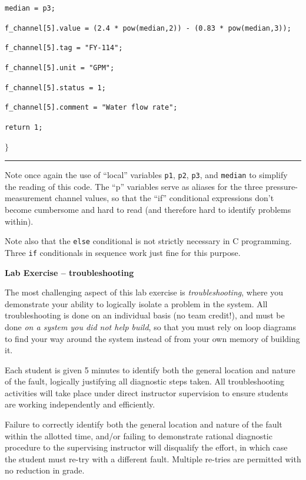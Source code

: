 {{{{\hskip 20pt {\tt  median = p3;}

\vskip 10pt

\hskip 10pt {\tt  f\_channel[5].value = (2.4 * pow(median,2)) - (0.83 * pow(median,3));}

\hskip 10pt {\tt  f\_channel[5].tag = "FY-114";}

\hskip 10pt {\tt  f\_channel[5].unit = "GPM";}

\hskip 10pt {\tt  f\_channel[5].status = 1;}

\hskip 10pt {\tt  f\_channel[5].comment = "Water flow rate";}

\vskip 10pt

\hskip 10pt {\tt return 1;}

$\rbrace$

}
\hskip 3pt}%
\vskip 5pt \hrule}%
\vrule}

\vskip 10pt

Note once again the use of ``local'' variables {\tt p1}, {\tt p2}, {\tt p3}, and {\tt median} to simplify the reading of this code.  The ``p'' variables serve as aliases for the three pressure-measurement channel values, so that the ``if'' conditional expressions don't become cumbersome and hard to read (and therefore hard to identify problems within).

Note also that the {\tt else} conditional is not strictly necessary in C programming.  Three {\tt if} conditionals in sequence work just fine for this purpose.






\vfil \eject

\noindent
{\bf Lab Exercise -- troubleshooting}

\vskip 5pt

The most challenging aspect of this lab exercise is {\it troubleshooting}, where you demonstrate your ability to logically isolate a problem in the system.  All troubleshooting is done on an individual basis (no team credit!), and must be done {\it on a system you did not help build}, so that you must rely on loop diagrams to find your way around the system instead of from your own memory of building it.

Each student is given 5 minutes to identify both the general location and nature of the fault, logically justifying all diagnostic steps taken.  All troubleshooting activities will take place under direct instructor supervision to ensure students are working independently and efficiently. 

Failure to correctly identify both the general location and nature of the fault within the allotted time, and/or failing to demonstrate rational diagnostic procedure to the supervising instructor will disqualify the effort, in which case the student must re-try with a different fault.  Multiple re-tries are permitted with no reduction in grade.

